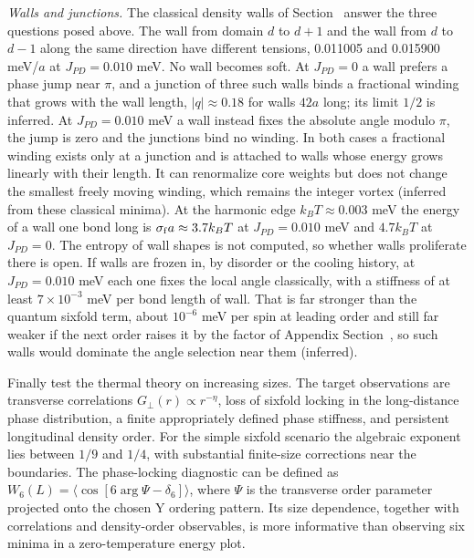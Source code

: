 \emph{Walls and junctions.} The classical density walls of
Section~ answer the three questions posed
above. The wall from domain \(d\) to \(d+1\) and the wall from \(d\) to
\(d-1\) along the same direction have different tensions, 0.011005 and
0.015900 meV/\(a\) at \(J_{PD}=0.010\) meV. No wall becomes soft. At
\(J_{PD}=0\) a wall prefers a phase jump near \(\pi\), and a junction
of three such walls binds a fractional winding that grows with the wall
length, \(|q|\approx0.18\) for walls \(42a\) long; its limit \(1/2\)
is inferred. At \(J_{PD}=0.010\) meV a wall instead fixes the absolute
angle modulo \(\pi\), the jump is zero and the junctions bind no
winding. In both cases a fractional winding exists only at a junction
and is attached to walls whose energy grows linearly with their length.
It can renormalize core weights but does not change the smallest freely
moving winding, which remains the integer vortex (inferred from these
classical minima). At the harmonic edge \(k_BT\approx0.003\) meV the
energy of a wall one bond long is \(\sigma_{\rm f}a\approx3.7k_BT\) at
\(J_{PD}=0.010\) meV and \(4.7k_BT\) at \(J_{PD}=0\). The entropy of
wall shapes is not computed, so whether walls proliferate there is open.
If walls are frozen in, by disorder or the cooling history, at
\(J_{PD}=0.010\) meV each one fixes the local angle classically, with a
stiffness of at least \(7\times10^{-3}\) meV per bond length of wall.
That is far stronger than the quantum sixfold term, about
\(10^{-6}\) meV per spin at leading order and still far weaker if the
next order raises it by the factor of Appendix
Section~, so such walls would dominate the
angle selection near them (inferred).

Finally test the thermal theory on increasing sizes. The target
observations are transverse correlations
\(G_\perp(r)\propto r^{-\eta}\), loss of sixfold locking in the
long-distance phase distribution, a finite appropriately defined phase
stiffness, and persistent longitudinal density order. For the simple
sixfold scenario the algebraic exponent lies between \(1/9\) and
\(1/4\), with substantial finite-size corrections near the boundaries.
The phase-locking diagnostic can be defined as
\(W_6(L)=\langle\cos[6\arg\Psi-\delta_6]\rangle\), where \(\Psi\) is the
transverse order parameter projected onto the chosen Y ordering pattern.
Its size dependence, together with correlations and density-order
observables, is more informative than observing six minima in a
zero-temperature energy plot.

